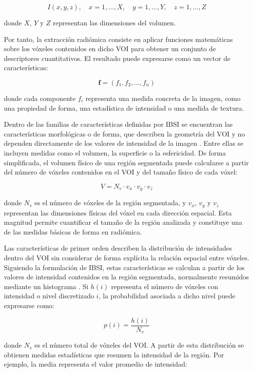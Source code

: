 \[
I(x,y,z), \quad x=1,\ldots,X,\quad y=1,\ldots,Y,\quad z=1,\ldots,Z
\]

donde $X$, $Y$ y $Z$ representan las dimensiones del volumen.

Por tanto, la extracción radiómica consiste en aplicar funciones matemáticas sobre los vóxeles contenidos en dicho VOI para obtener un conjunto de descriptores cuantitativos. El resultado puede expresarse como un vector de características:

\[
\mathbf{f} = (f_1, f_2, \ldots, f_n)
\]

donde cada componente $f_i$ representa una medida concreta de la imagen, como una propiedad de forma, una estadística de intensidad o una medida de textura.


Dentro de las familias de características definidas por IBSI se encuentran las características morfológicas o de forma, que describen la geometría del VOI y no dependen directamente de los valores de intensidad de la imagen \cite{Zwanenburg2020}. Entre ellas se incluyen medidas como el volumen, la superficie o la esfericidad. De forma simplificada, el volumen físico de una región segmentada puede calcularse a partir del número de vóxeles contenidos en el VOI y del tamaño físico de cada vóxel:

\[
V = N_v \cdot v_x \cdot v_y \cdot v_z
\]

donde $N_v$ es el número de vóxeles de la región segmentada, y $v_x$, $v_y$ y $v_z$ representan las dimensiones físicas del vóxel en cada dirección espacial. Esta magnitud permite cuantificar el tamaño de la región analizada y constituye una de las medidas básicas de forma en radiómica.


Las características de primer orden describen la distribución de intensidades dentro del VOI sin considerar de forma explícita la relación espacial entre vóxeles. Siguiendo la formulación de IBSI, estas características se calculan a partir de los valores de intensidad contenidos en la región segmentada, normalmente resumidos mediante un histograma \cite{Zwanenburg2020}. Si $h(i)$ representa el número de vóxeles con intensidad o nivel discretizado $i$, la probabilidad asociada a dicho nivel puede expresarse como:

\[
p(i) = \frac{h(i)}{N_v}
\]

donde $N_v$ es el número total de vóxeles del VOI. A partir de esta distribución se obtienen medidas estadísticas que resumen la intensidad de la región. Por ejemplo, la media representa el valor promedio de intensidad:

